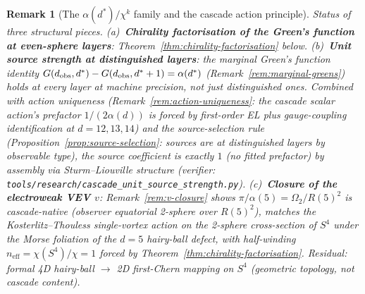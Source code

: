 \documentclass[12pt,a4paper]{article}
\newtheorem*{remark}{Remark}
\begin{document}
\begin{remark}[The $\alpha(d^*)/\chi^k$ family and the cascade action principle]
\emph{Status of three structural pieces.} (a)~\textbf{Chirality factorisation of the Green's function at even-sphere layers}: Theorem~\ref{thm:chirality-factorisation} below. (b)~\textbf{Unit source strength at distinguished layers}: the marginal Green's function identity $G(d_{\rm obs},d^*)-G(d_{\rm obs},d^*+1)=\alpha(d^*)$ (Remark~\ref{rem:marginal-greens}) holds at \emph{every} layer at machine precision, not just distinguished ones. Combined with action uniqueness (Remark~\ref{rem:action-uniqueness}: the cascade scalar action's prefactor $1/(2\alpha(d))$ is forced by first-order EL plus gauge-coupling identification at $d=12,13,14$) and the source-selection rule (Proposition~\ref{prop:source-selection}: sources are at distinguished layers by observable type), the source coefficient is exactly $1$ (no fitted prefactor) by assembly via Sturm--Liouville structure (verifier: \texttt{tools/research/cascade\_unit\_source\_strength.py}). (c)~\textbf{Closure of the electroweak VEV $v$}: Remark~\ref{rem:v-closure} shows $\pi/\alpha(5) = \Omega_2/R(5)^2$ is cascade-native (observer equatorial 2-sphere over $R(5)^2$), matches the Kosterlitz--Thouless single-vortex action on the 2-sphere cross-section of $S^4$ under the Morse foliation of the $d{=}5$ hairy-ball defect, with half-winding $n_{\mathrm{eff}} = \chi(S^4)/\chi = 1$ forced by Theorem~\ref{thm:chirality-factorisation}. Residual: formal 4D hairy-ball $\to$ 2D first-Chern mapping on $S^4$ (geometric topology, not cascade content).
\end{remark}
\end{document}
